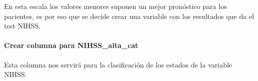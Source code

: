 \begin{table}[H]
\centering
\setlength{\tabcolsep}{5pt}
\caption{Cantidad de pacientes en la escala NIHSS en alta}
\label{tab:nihss alta}
\end{table}
        
    En esta escala los valores menores suponen un mejor pronóstico para los pacientes, es por eso que se decide crear una variable con los resultados que da el test NIHSS.

    \hypertarget{crear-columna-para-nihss_alta_cat}{%
\paragraph{Crear columna para NIHSS\_alta\_cat}\label{crear-columna-para-nihss_alta_cat}}

	Esta columna nos servirá para la clasificación de los estados de la variable NIHSS.

